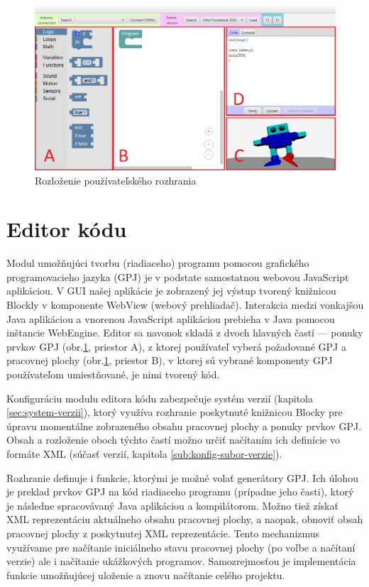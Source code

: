 \begin{figure}
\centerline{\includegraphics[width=1\textwidth]{images/rozlozenie-gui}}
\caption[Rozloženie používateľského rozhrania]{Rozloženie používateľského rozhrania}
\label{obr:gui-layout}
\end{figure}


\section{Editor kódu}
\label{sec:editor-kodu}
Modul umožňujúci tvorbu (riadiaceho) programu pomocou grafického programovacieho jazyka (GPJ) je v podstate samostatnou webovou JavaScript aplikáciou. V GUI našej aplikácie je zobrazený jej výstup tvorený knižnicou Blockly v komponente WebView (webový prehliadač). Interakcia medzi vonkajšou Java aplikáciou a vnorenou JavaScript aplikáciou prebieha v Java pomocou inštancie WebEngine. Editor sa navonok skladá z dvoch hlavných častí --- ponuky prvkov GPJ (obr.\ref{obr:gui-layout}, priestor A), z ktorej používateľ vyberá požadované  GPJ a pracovnej plochy (obr.\ref{obr:gui-layout}, priestor B), v ktorej sú vybrané komponenty GPJ používateľom umiestňované, je nimi tvorený kód.

Konfiguráciu modulu editora kódu zabezpečuje systém verzií (kapitola \ref{sec:system-verzii}), ktorý využíva rozhranie poskytnuté knižnicou Blocky pre úpravu momentálne zobrazeného obsahu pracovnej plochy a ponuky prvkov GPJ. Obsah a rozloženie oboch týchto častí možno určiť načítaním ich definície vo formáte XML (súčasť verzií,  kapitola \ref{sub:konfig-subor-verzie}).

Rozhranie definuje i funkcie, ktorými je možné volať generátory GPJ. Ich úlohou je preklad prvkov GPJ na kód riadiaceho programu (prípadne jeho časti), ktorý je následne spracovávaný Java aplikáciou a kompilátorom. Možno tiež získať XML reprezentáciu aktuálneho obsahu pracovnej plochy, a naopak, obnoviť obsah pracovnej plochy z poskytnutej XML reprezentácie. Tento mechanizmus využívame pre načítanie iniciálneho stavu pracovnej plochy (po voľbe a načítaní verzie) ale i načítanie ukážkových programov. Samozrejmosťou je implementácia funkcie umožňujúcej uloženie a znovu načítanie celého projektu.

